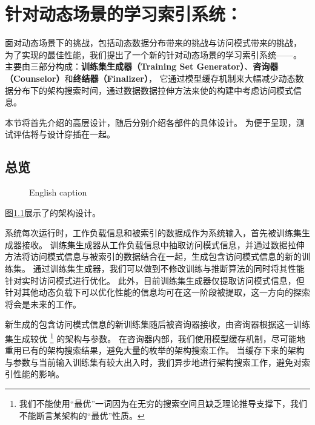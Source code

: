 \chapter{针对动态场景的学习索引系统：\sys}
\label{chap:sys}

面对动态场景下的挑战，包括动态数据分布带来的挑战与访问模式带来的挑战，
为了实现{\li}的最佳性能，我们提出了一个新的针对动态场景的学习索引系统{------}{\sys}。
{\sys}主要由三部分构成：\textbf{训练集生成器（Training Set Generator）}、\textbf{咨询器（Counselor）}和\textbf{终结器（Finalizer）}，
它通过模型缓存机制来大幅减少动态数据分布下的{\rmi}架构搜索时间，通过数据数据拉伸方法来使{\li}的构建中考虑访问模式信息。

本节将首先介绍{\sys}的高层设计，随后分别介绍{\sys}各部件的具体设计。
为便于呈现，测试评估将与设计穿插在一起。


\section{总览}

\begin{figure}[!htp]
  \centering
    {English caption}
  \label{fig:arch}
\end{figure}

图\ref{fig:arch}展示了{\sys}的架构设计。

系统每次运行时，工作负载信息和被索引的数据成作为系统输入，首先被训练集生成器接收。
训练集生成器从工作负载信息中抽取访问模式信息，并通过数据拉伸方法将访问模式信息与被索引的数据结合在一起，生成包含访问模式信息的新的训练集。
通过训练集生成器，我们可以做到不修改{\rmi}训练与推断算法的同时将其性能针对实时访问模式进行优化。
此外，目前训练集生成器仅提取访问模式信息，但针对其他动态负载下可以优化{\li}性能的信息均可在这一阶段被提取，这一方向的探索将会是未来的工作。

新生成的包含访问模式信息的新训练集随后被咨询器接收，由咨询器根据这一训练集生成较优
\footnote{我们不能使用``最优''一词因为在无穷的搜索空间且缺乏理论推导支撑下，我们不能断言某{\rmi}架构的``最优''性质。}
的{\rmi}架构与参数。
在咨询器内部，我们使用模型缓存机制，尽可能地重用已有的架构搜索结果，避免大量的枚举的架构搜索工作。
当缓存下来的{\rmi}架构与参数与当前输入训练集有较大出入时，我们异步地进行架构搜索工作，避免对索引性能的影响。

